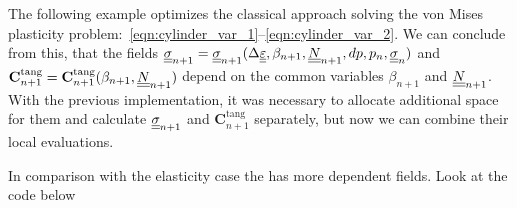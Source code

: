 \documentclass[12pt]{article}
\newcommand{\todolink}{\todo[fancyline, size=\scriptsize]{TOCITE}}
\begin{document}
The following example optimizes the classical approach solving the von Mises plasticity problem:~\eqref{eqn:cylinder_var_1}--\eqref{eqn:cylinder_var_2}.
We can conclude from this, that the fields $\underline{\underline{\sigma}}_{n+1} = \underline{\underline{\sigma}}_{n+1}(\Delta\underline{\underline{\varepsilon}}, \beta_{n+1}, \underline{\underline{N}}_{n+1}, dp, p_n, \underline{\underline{\sigma}}_n)$ and $\mathbf{C}^\text{tang}_{n+1} = \mathbf{C}^\text{tang}_{n+1}(\beta_{n+1}, \underline{\underline{N}}_{n+1})$ depend on the common variables $\beta_{n+1}$ and $\underline{\underline{N}}_{n+1}$. With the previous implementation, it was necessary to allocate additional space for them and calculate $\underline{\underline{\sigma}}_{n+1}$ and $\mathbf{C}^\text{tang}_{n+1}$ separately, but now we can combine their local evaluations.

In comparison with the elasticity case the   has more dependent fields. Look at the code below
\end{document}
